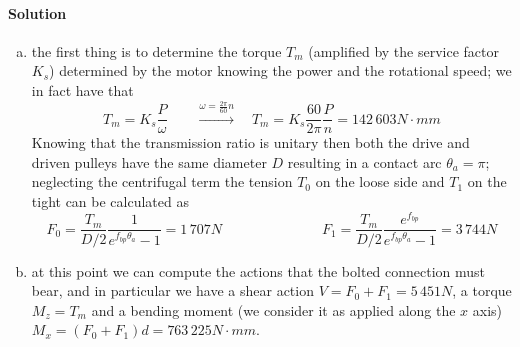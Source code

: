 	\paragraph{Solution}
	\begin{enumerate}[a)]
		\item the first thing is to determine the torque $T_m$ (amplified by the service factor $K_s$) determined by the motor knowing the power and the rotational speed; we in fact have that
		\[ T_m =  K_s \frac P \omega \qquad \xrightarrow{\omega = \frac{2\pi}{60} n} \quad T_m = K_s \frac{60}{2\pi} \frac{P}{n} = 142\, 603 N\cdot mm \]
		Knowing that the transmission ratio is unitary then both the drive and driven pulleys have the same diameter $D$ resulting in a contact arc $\theta_a = \pi$; neglecting the centrifugal term the tension $T_0$ on the loose side and $T_1$ on the tight can be calculated as
		\[ F_0 = \frac{T_m}{D/2} \frac{1}{e^{f_{bp} \theta_a} - 1} = 1\,707N \hspace{3cm} F_1 = \frac{T_m}{D/2} \frac{e^{f_{bp} }}{e^{f_{bp} \theta_a} - 1} = 3\,744N \]
		
		\item at this point we can compute the actions that the bolted connection must bear, and in particular we have a shear action $V = F_0 + F_1 =  5\,451N$, a torque $M_z = T_m$ and a bending moment (we consider it as applied along the $x$ axis) $M_x = (F_0+F_1) d = 763\, 225 N\cdot mm$.
		

\end{enumerate}
